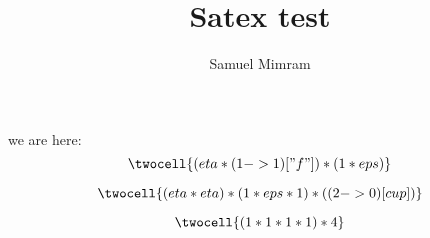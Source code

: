 \documentclass[a4paper]{article}
\title{Satex test}
\author{Samuel Mimram}
\begin{document}
\maketitle

we are here:
\[
  \twocell{(eta * (1->1)["f"]) * (1 * eps)}
\]

\[
  \twocell{(eta * eta) * (1 * eps * 1) * ((2->0)[cup])}
\]

\[
  \twocell{(1 * 1 * 1 * 1)*4}
\]





\end{document}
